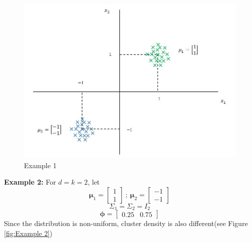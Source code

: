 \documentclass[a4paper,english,12pt]{article}
\begin{document}
\begin{figure}[h]
\centering
\includegraphics[width=0.9\linewidth]{Figures/Lect26fig1.jpg}
\caption[rdr]{Example 1}
\label{fig:Example 1}
\end{figure}

\textbf{Example 2:}
For $d=k=2$, let $$\boldsymbol{\mu}_1=\begin{bmatrix}
1\\
1
\end{bmatrix}
~;~ \boldsymbol{\mu}_2=\begin{bmatrix}
-1\\
-1
\end{bmatrix}$$
$$\Sigma_1=\Sigma_2=I_2$$
$$\pmb{\phi}=
\begin{bmatrix}
    0.25   &0.75
    \end{bmatrix}$$
Since the distribution is non-uniform, cluster density is also different(see Figure \ref{fig:Example 2})\\
\end{document}
